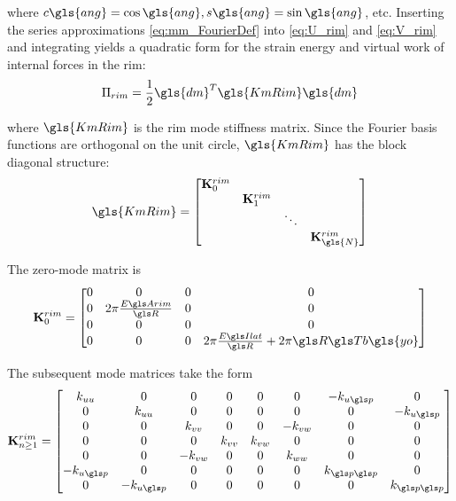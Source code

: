 \documentclass[\rootdir/thesis.tex]{subfiles}
\begin{document}
where $c\gls{ang}=\cos{\gls{ang}}, s\gls{ang}=\sin{\gls{ang}}$, etc. Inserting the series approximations \eqref{eq:mm_FourierDef} into \eqref{eq:U_rim} and \eqref{eq:V_rim} and integrating yields a quadratic form for the strain energy and virtual work of internal forces in the rim:
\begin{equation}
\label{eq:mm_U_rim}
\Pi_{rim} = \frac{1}{2} \gls{dm}^T \gls{KmRim} \gls{dm}
\end{equation}

where $\gls{KmRim}$ is the rim mode stiffness matrix. Since the Fourier basis functions are orthogonal on the unit circle, $\gls{KmRim}$ has the block diagonal structure:
\begin{equation}
\label{eq:mm_K_rim}
\gls{KmRim} =
\begin{bmatrix}
\mathbf{K}_0^{rim} & & &\\
& \mathbf{K}_1^{rim} & &\\
& & \ddots &\\
& & & \mathbf{K}_{\gls{N}}^{rim}
\end{bmatrix}
\end{equation}

The zero-mode matrix is
\begin{equation}
\mathbf{K}_0^{rim} =
\begin{bmatrix}
0 & 0 & 0 & 0\\
0 & 2\pi \frac{\EA}{\R} & 0 & 0\\
0 & 0 & 0 & 0\\
0 & 0 & 0 & 2\pi \frac{\EIl}{\R} + 2\pi \R\Tb\gls{yo}
\end{bmatrix}
\end{equation}

The subsequent mode matrices take the form
\begin{equation}
\mathbf{K}_{n\geq 1}^{rim} =
\begin{bmatrix}
k_{uu} & 0 & 0 & 0 & 0 & 0 & -k_{u\p} & 0\\
0 & k_{uu} & 0 & 0 & 0 & 0 & 0 & -k_{u\p}\\
0 & 0 & k_{vv} & 0 & 0 & -k_{vw} & 0 & 0\\
0 & 0 & 0 & k_{vv} & k_{vw} & 0 & 0 & 0\\
0 & 0 & -k_{vw} & 0 & 0 & k_{ww} & 0 & 0\\
-k_{u\p} & 0 & 0 & 0 & 0 & 0 & k_{\p\p} & 0\\
0 & -k_{u\p} & 0 & 0 & 0 & 0 & 0 & k_{\p\p}
\end{bmatrix}
\end{equation}
\end{document}
